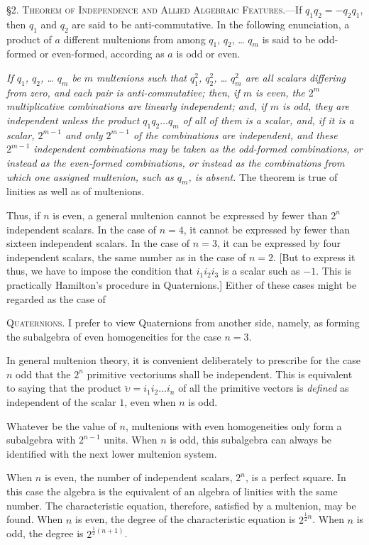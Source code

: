 \documentclass[11pt]{article}
\begin{document}
\noindent\textsc{\S 2. Theorem of Independence and Allied Algebraic Features.}---If $q_1q_2=-q_2q_1$, then $q_1$ and $q_2$ are said to be anti-commutative. In the following enunciation, a product of $a$ different multenions from among $q_1$, $q_2$, \ldots{} $q_m$ is said to be odd-formed or even-formed, according as $a$ is odd or even.

\indent \emph{If $q_1$, $q_2$, \ldots{} $q_m$ be $m$ multenions such that $q_1^2$, $q_2^2$, \ldots{} $q_m^2$ are all scalars differing from zero, and each pair is anti-commutative; then, if $m$ is even, the $2^m$ multiplicative combinations are linearly independent; and, if $m$ is odd, they are independent unless the product $q_1q_2\ldots q_m$ of all of them is a scalar, and, if it is a scalar, $2^{m-1}$ and only $2^{m-1}$ of the combinations are independent, and these $2^{m-1}$ independent combinations may be taken as the odd-formed combinations, or instead as the even-formed combinations, or instead as the combinations from which one assigned multenion, such as $q_m$, is absent.} The theorem is true of linities as well as of multenions.

\indent Thus, if $n$ is even, a general multenion cannot be expressed by fewer than $2^n$ independent scalars. In the case of $n=4$, it cannot be expressed by fewer than sixteen independent scalars. In the case of $n=3$, it can be expressed by four independent scalars, the same number as in the case of $n=2$. [But to express it thus, we have to impose the condition that $i_1i_2i_3$ is a scalar such as $-1$. This is practically Hamilton's procedure in Quaternions.] Either of these cases might be regarded as the case of

\noindent\textsc{Quaternions.} I prefer to view Quaternions from another side, namely, as forming the subalgebra of even homogeneities for the case $n=3$.

\indent In general multenion theory, it is convenient deliberately to prescribe for the case $n$ odd that the $2^n$ primitive vectoriums shall be independent. This is equivalent to saying that the product $\breve{\upsilon}=i_1i_2\ldots i_n$ of all the primitive vectors is \emph{defined} as independent of the scalar $1$, even when $n$ is odd.

\indent Whatever be the value of $n$, multenions with even homogeneities only form a subalgebra with $2^{n-1}$ units. When $n$ is odd, this subalgebra can always be identified with the next lower multenion system.

\indent When $n$ is even, the number of independent scalars, $2^n$, is a perfect square. In this case the algebra is the equivalent of an algebra of linities with the same number. The characteristic equation, therefore, satisfied by a multenion, may be found. When $n$ is even, the degree of the characteristic equation is $2^{\frac12n}$. When $n$ is odd, the degree is $2^{\frac12(n+1)}$.
\end{document}
